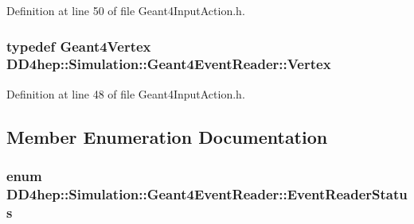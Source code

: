 Definition at line 50 of file Geant4InputAction.h.\hypertarget{class_d_d4hep_1_1_simulation_1_1_geant4_event_reader_ac9738208fe520e5aa2ad1efa13de82e7}{
\subsubsection[{Vertex}]{\setlength{\rightskip}{0pt plus 5cm}typedef {\bf Geant4Vertex} {\bf DD4hep::Simulation::Geant4EventReader::Vertex}}}
\label{class_d_d4hep_1_1_simulation_1_1_geant4_event_reader_ac9738208fe520e5aa2ad1efa13de82e7}


Definition at line 48 of file Geant4InputAction.h.

\subsection{Member Enumeration Documentation}
\hypertarget{class_d_d4hep_1_1_simulation_1_1_geant4_event_reader_ae4f4bc83ffcf5b0c1868ad78859851e7}{
\subsubsection[{EventReaderStatus}]{\setlength{\rightskip}{0pt plus 5cm}enum {\bf DD4hep::Simulation::Geant4EventReader::EventReaderStatus}}}
\label{class_d_d4hep_1_1_simulation_1_1_geant4_event_reader_ae4f4bc83ffcf5b0c1868ad78859851e7}


